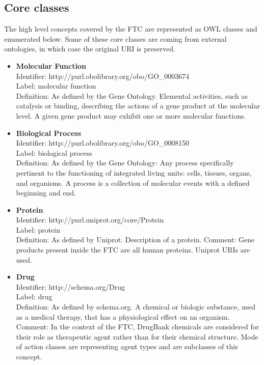 \documentclass{bioinfo}
\begin{document}
\subsection{Core classes}
The high level concepts covered by the FTC are represented as OWL classes and enumerated below. 
Some of these core classes are coming from external ontologies, in which case the original URI is preserved.


\begin{itemize}
\item \textbf{Molecular Function} \\
Identifier: http://purl.obolibrary.org/obo/GO\_0003674 \\
Label: molecular function \\
Definition: As defined by the Gene Ontology. Elemental activities, such as catalysis or binding, describing 
the actions of a gene product at the molecular level. A given gene product may exhibit one or more molecular functions.
\end{itemize}

\begin{itemize}
\item \textbf{Biological Process} \\
Identifier: http://purl.obolibrary.org/obo/GO\_0008150 \\
Label: biological process \\
Definition: As defined by the Gene Ontology: Any process specifically pertinent to the functioning of 
integrated living units: cells, tissues, organs, and organisms. A process is a collection of molecular 
events with a defined beginning and end.
\end{itemize}

\begin{itemize}
\item \textbf{Protein} \\
Identifier: http://purl.uniprot.org/core/Protein \\
Label: protein \\
Definition: As defined by Uniprot. Description of a protein.
Comment: Gene products present inside the FTC are all human proteins. Uniprot URIs are used.
\end{itemize}

\begin{itemize}
\item \textbf{Drug} \\
Identifier: http://schema.org/Drug \\
Label: drug \\
Definition: As defined by schema.org. A chemical or biologic substance, used as a medical therapy, that has a 
physiological effect on an organism. \\
Comment: In the context of the FTC, DrugBank chemicals are considered for their role as therapeutic agent 
rather than for their chemical structure. Mode of action classes are representing agent types and are subclasses of this concept.
\end{itemize}
\end{document}
